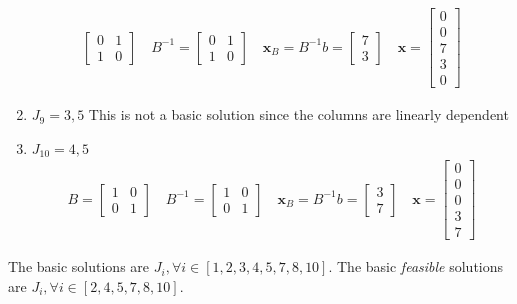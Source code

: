 \documentclass[11pt]{article}
\begin{document}
\begin{enumerate}
\begin{align*}
\begin{bmatrix}
          0 & 1 \\ 1 & 0
        \end{bmatrix}
        \quad
        B^{-1} =
        \begin{bmatrix}
          0 & 1 \\ 1 & 0
        \end{bmatrix}
        \quad 
        \textbf{x}_{B} = B^{-1} b = 
        \begin{bmatrix}
          7 \\ 3
        \end{bmatrix}
        \quad
        \textbf{x} =
        \begin{bmatrix}
          0 \\ 0 \\ 7 \\ 3 \\ 0
        \end{bmatrix}
      \end{align*}
    \item $J_{9} = 3,5$
    This is not a basic solution since the columns are linearly dependent
    \item $J_{10} = 4,5$
    \begin{align*}
        B = 
        \begin{bmatrix}
          1 & 0 \\ 0 & 1
        \end{bmatrix}
        \quad
        B^{-1} =
        \begin{bmatrix}
          1 & 0 \\ 0 & 1
        \end{bmatrix}
        \quad 
        \textbf{x}_{B} = B^{-1} b = 
        \begin{bmatrix}
          3 \\ 7
        \end{bmatrix}
        \quad
        \textbf{x} =
        \begin{bmatrix}
          0 \\ 0 \\ 0 \\ 3 \\ 7
        \end{bmatrix}
      \end{align*}
\end{enumerate}
The basic solutions are $J_i, \forall i \in [1,2,3,4,5,7,8,10]$.
The basic \textit{feasible} solutions are $J_i, \forall i \in [2,4,5,7,8,10]$.
\end{document}
